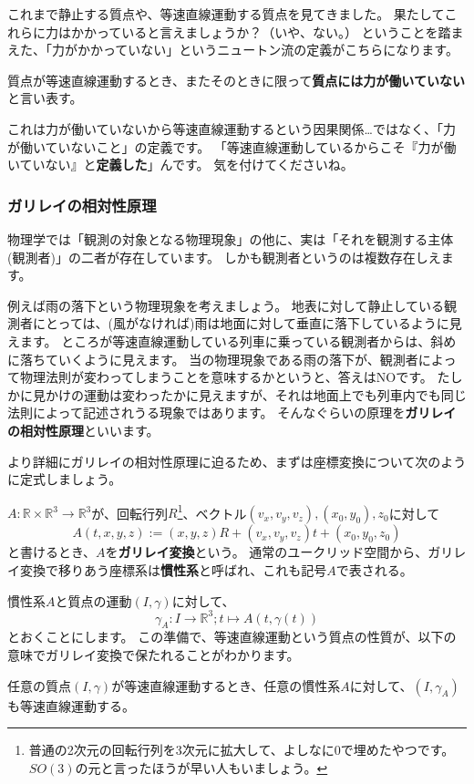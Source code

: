 これまで静止する質点や、等速直線運動する質点を見てきました。
果たしてこれらに力はかかっていると言えましょうか？（いや、ない。）
ということを踏まえた、「力がかかっていない」というニュートン流の定義がこちらになります。
\begin{definition}[慣性の法則]
  質点が等速直線運動するとき、またそのときに限って\textbf{質点には力が働いていない}と言い表す。
\end{definition}

これは力が働いていないから等速直線運動するという因果関係…ではなく、「力が働いていないこと」の定義です。
「等速直線運動しているからこそ『力が働いていない』と\textbf{定義した}」んです。
気を付けてくださいね。

\subsubsection{ガリレイの相対性原理}

物理学では「観測の対象となる物理現象」の他に、実は「それを観測する主体(観測者)」の二者が存在しています。
しかも観測者というのは複数存在しえます。

例えば雨の落下という物理現象を考えましょう。
地表に対して静止している観測者にとっては、(風がなければ)雨は地面に対して垂直に落下しているように見えます。
ところが等速直線運動している列車に乗っている観測者からは、斜めに落ちていくように見えます。
当の物理現象である雨の落下が、観測者によって物理法則が変わってしまうことを意味するかというと、答えはNOです。
たしかに見かけの運動は変わったかに見えますが、それは地面上でも列車内でも同じ法則によって記述されうる現象ではあります。
そんなぐらいの原理を\textbf{ガリレイの相対性原理}といいます。

より詳細にガリレイの相対性原理に迫るため、まずは座標変換について次のように定式しましょう。
\begin{definition}[ガリレイ変換]
  $A:\mathbb{R}\times\mathbb{R}^3\to\mathbb{R}^3$が、回転行列$R$\footnote{
    普通の2次元の回転行列を3次元に拡大して、よしなに0で埋めたやつです。$SO(3)$の元と言ったほうが早い人もいましょう。
  }、ベクトル$(v_x,v_y,v_z),(x_0,y_0),z_0$に対して
  \[
    A(t,x,y,z):=(x,y,z)R+(v_x,v_y,v_z)t+(x_0,y_0,z_0)
  \]
  と書けるとき、$A$を\textbf{ガリレイ変換}という。
  通常のユークリッド空間から、ガリレイ変換で移りあう座標系は\textbf{慣性系}と呼ばれ、これも記号$A$で表される。
\end{definition}

慣性系$A$と質点の運動$(I,\gamma)$に対して、
\[
  \gamma_A:I\to\mathbb{R}^3;t\mapsto A(t,\gamma(t))
\]
とおくことにします。
この準備で、等速直線運動という質点の性質が、以下の意味でガリレイ変換で保たれることがわかります。
\begin{theorem}
  任意の質点$(I,\gamma)$が等速直線運動するとき、任意の慣性系$A$に対して、$(I,\gamma_A)$も等速直線運動する。
\end{theorem}

